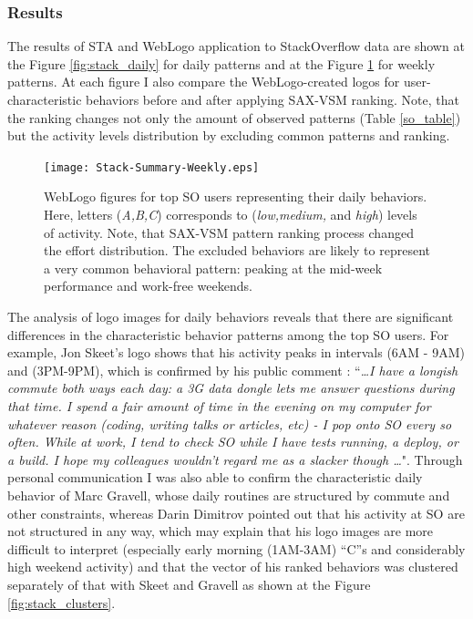 \subsubsection{Results}
The results of STA and WebLogo application to StackOverflow data are shown at the Figure \ref{fig:stack_daily} for daily patterns and at the Figure \ref{fig:stack_weekly} for weekly patterns. At each figure I also compare the WebLogo-created logos for user-characteristic behaviors before and after applying SAX-VSM ranking. Note, that the ranking changes not only the amount of observed patterns (Table \ref{so_table}) but the activity levels distribution by excluding common patterns and ranking.

\begin{figure}[t]
   \centering
   \texttt{[image: Stack-Summary-Weekly.eps]}
   \caption{WebLogo figures for top SO users representing their daily behaviors. Here, letters (\textit{A,B,C}) corresponds to (\textit{low,medium,} and \textit{high}) levels of activity. Note, that SAX-VSM pattern ranking process changed the effort distribution. 
   The excluded behaviors are likely to represent a very common behavioral pattern: peaking at the mid-week performance and work-free weekends.}
   \label{fig:stack_weekly}   
\end{figure}

The analysis of logo images for daily behaviors reveals that there are significant differences in the characteristic behavior patterns among the top SO users. For example, Jon Skeet's logo shows that his activity peaks in intervals (6AM - 9AM) and (3PM-9PM), which is confirmed by his public comment \cite{skeet}: ``\textit{\dots I have a longish commute both ways each day: a 3G data dongle lets me answer questions during that time. I spend a fair amount of time in the evening on my computer for whatever reason (coding, writing talks or articles, etc) - I pop onto SO every so often. While at work, I tend to check SO while I have tests running, a deploy, or a build. I hope my colleagues wouldn't regard me as a slacker though \dots}". Through personal communication I was also able to confirm the characteristic daily behavior of Marc Gravell, whose daily routines are structured by commute and other constraints, whereas Darin Dimitrov pointed out that his activity at SO are not structured in any way, which may explain that his logo images are more difficult to interpret (especially early morning (1AM-3AM) ``C''s and considerably high weekend activity) and that the vector of his ranked behaviors was clustered separately of that with Skeet and Gravell as shown at the Figure \ref{fig:stack_clusters}.

